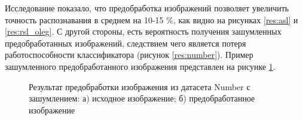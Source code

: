 Исследование показало, что предобработка изображений позволяет увеличить точность распознавания в среднем на 10-15 \%, как видно на рисунках \ref{res:asl} и \ref{res:rsl_oleg}. С другой стороны, есть вероятность получения зашумленных предобработанных изображений, следствием чего является потеря работоспособности классификатора (рисунок \ref{res:number}). Пример зашумленного предобработанного изображения представлен на рисунке \ref{res:bad_preproc}.

\begin{figure}[ht!]
	\begin{minipage}[h]{0.49\linewidth}
	\end{minipage}
	\hfill
	\begin{minipage}[h]{0.49\linewidth}
	\end{minipage}
	\caption{Результат предобработки изображения из датасета Number с зашумлением: а) исходное изображение; б) предобработанное изображение}
	\label{res:bad_preproc}
\end{figure}

